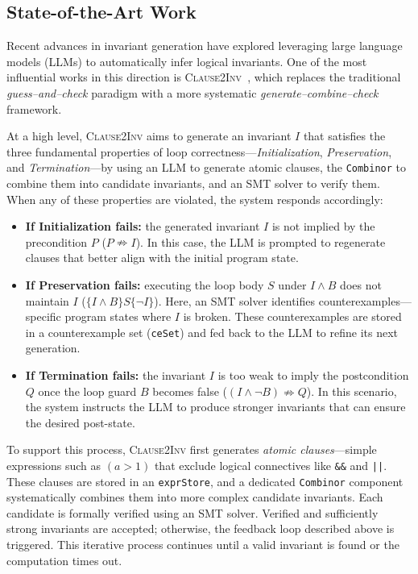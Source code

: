 \subsection{State-of-the-Art Work}

Recent advances in invariant generation have explored leveraging large language models (LLMs) to automatically infer logical invariants. One of the most influential works in this direction is \textsc{Clause2Inv}~\cite{cao2025clause2inv}, which replaces the traditional \textit{guess–and–check} paradigm with a more systematic \textit{generate–combine–check} framework.

At a high level, \textsc{Clause2Inv} aims to generate an invariant $I$ that satisfies the three fundamental properties of loop correctness—\textit{Initialization}, \textit{Preservation}, and \textit{Termination}—by using an LLM to generate atomic clauses, the \texttt{Combinor} to combine them into candidate invariants, and an SMT solver to verify them. When any of these properties are violated, the system responds accordingly:

\begin{itemize}
    \item \textbf{If Initialization fails:} the generated invariant $I$ is not implied by the precondition $P$ ($P \nRightarrow I$).  
    In this case, the LLM is prompted to regenerate clauses that better align with the initial program state.

    \item \textbf{If Preservation fails:} executing the loop body $S$ under $I \wedge B$ does not maintain $I$ ($\{I \wedge B\} S \{\lnot I\}$).  
    Here, an SMT solver identifies counterexamples—specific program states where $I$ is broken.  
    These counterexamples are stored in a counterexample set (\texttt{ceSet}) and fed back to the LLM to refine its next generation.

    \item \textbf{If Termination fails:} the invariant $I$ is too weak to imply the postcondition $Q$ once the loop guard $B$ becomes false ($(I \wedge \lnot B) \nRightarrow Q$).  
    In this scenario, the system instructs the LLM to produce stronger invariants that can ensure the desired post-state.
\end{itemize}

To support this process, \textsc{Clause2Inv} first generates \textit{atomic clauses}—simple expressions such as $(a > 1)$ that exclude logical connectives like \texttt{\&\&} and \texttt{||}.  
These clauses are stored in an \texttt{exprStore}, and a dedicated \texttt{Combinor} component systematically combines them into more complex candidate invariants.  
Each candidate is formally verified using an SMT solver. Verified and sufficiently strong invariants are accepted; otherwise, the feedback loop described above is triggered.  
This iterative process continues until a valid invariant is found or the computation times out.

